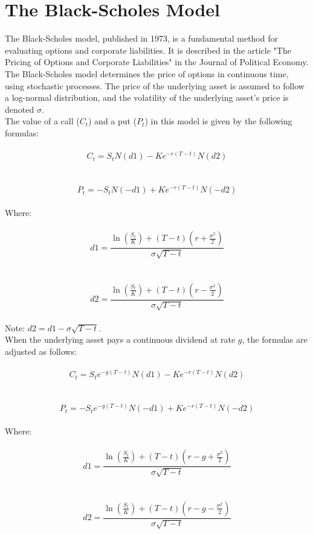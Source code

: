 \documentclass[a4paper,10pt]{article}
\begin{document}
\section*{The Black-Scholes Model}

    \noindent The Black-Scholes model, published in 1973, is a fundamental method for evaluating options and corporate liabilities. It is described in the article "The Pricing of Options and Corporate Liabilities" in the Journal of Political Economy.\\
    
    \noindent The Black-Scholes model determines the price of options in continuous time, using stochastic processes. The price of the underlying asset is assumed to follow a log-normal distribution, and the volatility of the underlying asset's price is denoted \( \sigma \).\\
    
    
    \noindent The value of a call (\( C_t \)) and a put (\( P_t \)) in this model is given by the following formulas:\\
    \\\[ C_t = S_t N(d1) - K e^{-r(T-t)} N(d2) \]\\
    \\\[ P_t = -S_t N(-d1) + K e^{-r(T-t)} N(-d2) \]\\
    
    \noindent Where:\\
    \\\[ d1 = \frac{\ln \left( \frac{S_t}{K} \right) + (T-t) \left( r + \frac{\sigma^2}{2} \right)}{\sigma \sqrt{T-t}} \]\\
    \\\[ d2 = \frac{\ln \left( \frac{S_t}{K} \right) + (T-t) \left( r - \frac{\sigma^2}{2} \right)}{\sigma \sqrt{T-t}} \]\\
    
    \noindent Note: \( d2 = d1 - \sigma \sqrt{T-t} \).\\
    
    \noindent When the underlying asset pays a continuous dividend at rate \( g \), the formulas are adjusted as follows:\\
    \\\[ C_t = S_t e^{-g(T-t)} N(d1) - K e^{-r(T-t)} N(d2) \]\\
    \\\[ P_t = -S_t e^{-g(T-t)} N(-d1) + K e^{-r(T-t)} N(-d2) \]\\
    
    \noindent Where:\\
    \\\[ d1 = \frac{\ln \left( \frac{S_t}{K} \right) + (T-t) \left( r - g + \frac{\sigma^2}{2} \right)}{\sigma \sqrt{T-t}} \]\\
    \\\[ d2 = \frac{\ln \left( \frac{S_t}{K} \right) + (T-t) \left( r - g - \frac{\sigma^2}{2} \right)}{\sigma \sqrt{T-t}} \]\\
\end{document}
